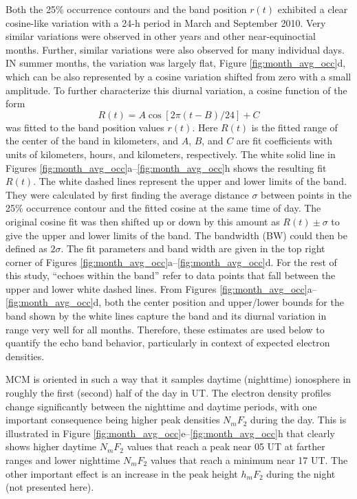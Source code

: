Both the 25\% occurrence contours and the band position \(r(t)\) exhibited a clear cosine-like variation with a 24-h period in March and September 2010.  Very similar variations were observed in other years and other near-equinoctial months.  Further, similar variations were also observed for many individual days.  IN summer months, the variation was largely flat, Figure \ref{fig:month_avg_occ}d, which can be also represented by a cosine variation shifted from zero with a small amplitude.  To further characterize this diurnal variation, a cosine function of the form
\begin{equation}\label{eqn:band}
R\left(t\right) = A \cos\left[2\pi\left(t-B\right)/24\right] + C
\end{equation}
was fitted to the band position values \(r(t)\). Here \(R(t)\) is the fitted range of the center of the band in kilometers, and  \(A\), \(B\), and \(C\) are fit coefficients with units of kilometers, hours, and kilometers, respectively. The white solid line in Figures \ref{fig:month_avg_occ}a--\ref{fig:month_avg_occ}h shows the resulting fit \(R\left(t\right)\). The white dashed lines represent the upper and lower limits of the band.  They were calculated by first finding the average distance \(\sigma\) between points in the 25\% occurrence contour and the fitted cosine at the same time of day. The original cosine fit was then shifted up or down by this amount as \(R\left(t\right) \pm \sigma\) to give the upper and lower limits of the band.  The bandwidth (BW) could then be defined as \(2\sigma\).  The fit parameters and band width are given in the top right corner of Figures \ref{fig:month_avg_occ}a--\ref{fig:month_avg_occ}d. For the rest of this study, ``echoes within the band'' refer to data points that fall between the upper and lower white dashed lines. From Figures \ref{fig:month_avg_occ}a--\ref{fig:month_avg_occ}d, both the center position and upper/lower bounds for the band shown by the white lines capture the band and its diurnal variation in range very well for all months. Therefore, these estimates are used below to quantify the echo band behavior, particularly in context of expected electron densities.

MCM is oriented in such a way that it samples daytime (nighttime) ionosphere in roughly the first (second) half of the day in UT. The electron density profiles change significantly between the nighttime and daytime periods, with one important consequence being higher peak densities \(N_mF_2\) during the day.  This is illustrated in Figure \ref{fig:month_avg_occ}e--\ref{fig:month_avg_occ}h that clearly shows higher daytime \(N_mF_2\) values that reach a peak near 05 UT at farther ranges and lower nighttime \(N_mF_2\) values that reach a minimum near 17 UT.  The other important effect is an increase in the peak height \(h_mF_2\) during the night (not presented here).

